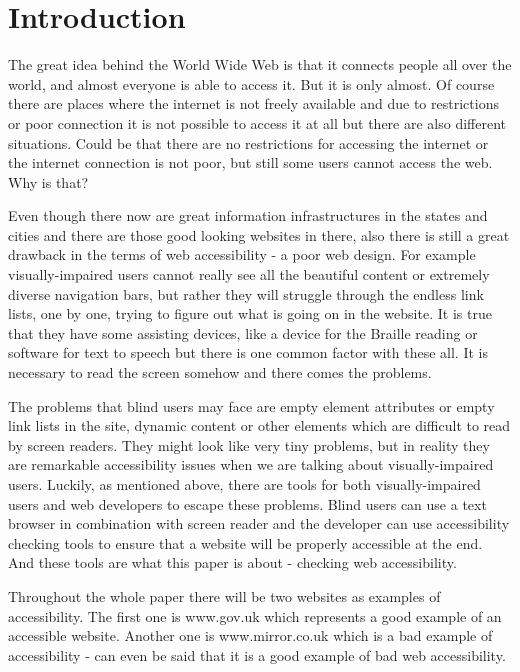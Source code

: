 %
%
% 
% 


\chapter{Introduction}

The great idea behind the World Wide Web is that it connects people all over the world, and almost everyone is able to access it. But it is only almost. Of course there are places where the internet is not freely available and due to restrictions or poor connection it is not possible to access it at all but there are also different situations. Could be that there are no restrictions for accessing the internet or the internet connection is not poor, but still some users cannot access the web. Why is that?

Even though there now are great information infrastructures in the states and cities and there are those good looking websites in there, also there is still a great drawback in the terms of web accessibility -  a poor web design. For example visually-impaired users cannot really see all the beautiful content or extremely diverse navigation bars, but rather they will struggle through the endless link lists, one by one, trying to figure out what is going on in the website. It is true that they have some assisting devices, like a device for the Braille reading or software for text to speech but there is one common factor with these all. It is necessary to read the screen somehow and  there comes the problems.

The problems that blind users may face are empty element attributes or empty link lists in the site, dynamic content or other elements which are difficult to read by screen readers. They might look like very tiny problems, but in reality they are remarkable accessibility issues when we are talking about visually-impaired users. Luckily, as mentioned above, there are tools for both visually-impaired users and web developers to escape these problems. Blind users can use a text browser in combination with screen reader and the developer can use accessibility checking tools to ensure that a website will be properly accessible at the end. And these tools are what this paper is about - checking web accessibility.

Throughout the whole paper there will be two websites as examples of accessibility. The first one is www.gov.uk which represents a good example of an accessible website. Another one is www.mirror.co.uk which is a bad example of accessibility - can even be said that it is a good example of bad web accessibility. 

